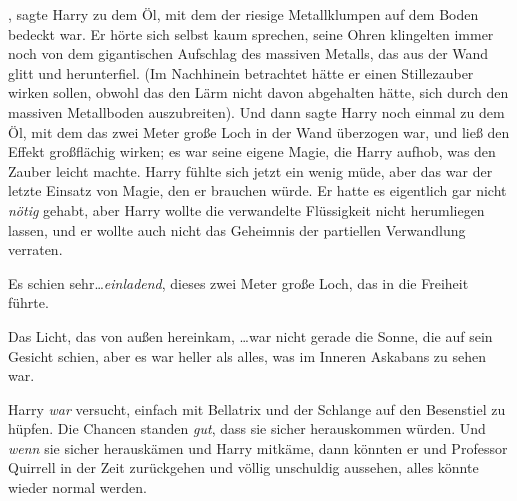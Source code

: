 , sagte Harry zu dem Öl, mit dem der riesige Metallklumpen auf dem Boden bedeckt war. Er hörte sich selbst kaum sprechen, seine Ohren klingelten immer noch von dem gigantischen Aufschlag des massiven Metalls, das aus der Wand glitt und herunterfiel. (Im Nachhinein betrachtet hätte er einen Stillezauber wirken sollen, obwohl das den Lärm nicht davon abgehalten hätte, sich durch den massiven Metallboden auszubreiten). Und dann sagte Harry noch einmal  zu dem Öl, mit dem das zwei Meter große Loch in der Wand überzogen war, und ließ den Effekt großflächig wirken; es war seine eigene Magie, die Harry aufhob, was den Zauber leicht machte. Harry fühlte sich jetzt ein wenig müde, aber das war der letzte Einsatz von Magie, den er brauchen würde. Er hatte es eigentlich gar nicht \emph{nötig} gehabt, aber Harry wollte die verwandelte Flüssigkeit nicht herumliegen lassen, und er wollte auch nicht das Geheimnis der partiellen Verwandlung verraten.

Es schien sehr…\emph{einladend}, dieses zwei Meter große Loch, das in die Freiheit führte.

Das Licht, das von außen hereinkam, …war nicht gerade die Sonne, die auf sein Gesicht schien, aber es war heller als alles, was im Inneren Askabans zu sehen war.

Harry \emph{war} versucht, einfach mit Bellatrix und der Schlange auf den Besenstiel zu hüpfen. Die Chancen standen \emph{gut}, dass sie sicher herauskommen würden. Und \emph{wenn} sie sicher herauskämen und Harry mitkäme, dann könnten er und Professor Quirrell in der Zeit zurückgehen und völlig unschuldig aussehen, alles könnte wieder normal werden.

